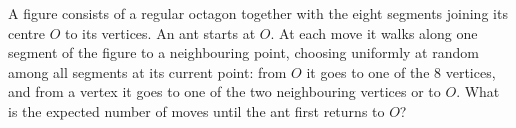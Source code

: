 A figure consists of a regular octagon together with the eight segments joining its centre $O$ to its vertices. An ant starts at $O$. At each move it walks along one segment of the figure to a neighbouring point, choosing uniformly at random among all segments at its current point: from $O$ it goes to one of the $8$ vertices, and from a vertex it goes to one of the two neighbouring vertices or to $O$. What is the expected number of moves until the ant first returns to $O$?
